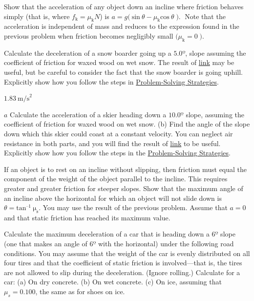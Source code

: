 \documentclass[
]{book}
\newenvironment{problems-exercises}{}{}
\begin{document}
\begin{problems-exercises}
\hypertarget{fs-id1395614}{}
\leavevmode\hypertarget{fs-id1395616}{}%
Show that the acceleration of any object down an incline where friction
behaves simply (that is, where \({{f_{\text{k}} = \mu_{\text{k}}}N}{}\))
is
\({{a = g}(\ \text{sin}\ {\theta - \mu_{\text{k}}}\text{cos}\ \theta\operatorname{).}}{}\)
Note that the acceleration is independent of mass and reduces to the
expression found in the previous problem when friction becomes
negligibly small \({({\mu_{\text{k}} = 0}\operatorname{).}}{}\)

\hypertarget{fs-id1555366}{}
\leavevmode\hypertarget{fs-id1555367}{}%
Calculate the deceleration of a snow boarder going up a \(5.0º{}\), slope
assuming the coefficient of friction for waxed wood on wet snow. The
result of \protect\hyperlink{fs-id1395614}{link} may be useful,
but be careful to consider the fact that the snow boarder is going
uphill. Explicitly show how you follow the steps in \href{/m54861}{Problem-Solving
Strategies}.

\leavevmode\hypertarget{fs-id1311021}{}%
\({1\text{.}\text{83}\ \text{m/s}^{2}}{}\)

\hypertarget{fs-id1453574}{}
\leavevmode\hypertarget{fs-id1329159}{}%
\(a\) Calculate the acceleration of a skier heading down a
\({\text{10}\text{.}0º}{}\) slope, assuming the coefficient of friction
for waxed wood on wet snow. (b) Find the angle of the slope down which
this skier could coast at a constant velocity. You can neglect air
resistance in both parts, and you will find the result of
\protect\hyperlink{fs-id1395614}{link} to be useful. Explicitly
show how you follow the steps in the \href{/m54861}{Problem-Solving
Strategies}.

\hypertarget{fs-id1736769}{}
\leavevmode\hypertarget{fs-id1300112}{}%
If an object is to rest on an incline without slipping, then friction
must equal the component of the weight of the object parallel to the
incline. This requires greater and greater friction for steeper slopes.
Show that the maximum angle of an incline above the horizontal for which
an object will not slide down is
\(\theta = \text{tan}^{\text{–1}}\ \text{μ}_{\text{s}}\). You may use the
result of the previous problem. Assume that \(a = \text{0}\) and that
static friction has reached its maximum value.

\hypertarget{fs-id855543}{}
\leavevmode\hypertarget{fs-id1244141}{}%
Calculate the maximum deceleration of a car that is heading down a
\(6º{}\) slope (one that makes an angle of \(6º{}\) with the horizontal)
under the following road conditions. You may assume that the weight of
the car is evenly distributed on all four tires and that the coefficient
of static friction is involved---that is, the tires are not allowed to
slip during the deceleration. (Ignore rolling.) Calculate for a car: (a)
On dry concrete. (b) On wet concrete. (c) On ice, assuming that
\({{\mu_{s} = 0}\text{.}\text{100}}{}\), the same as for shoes on ice.


\end{problems-exercises}
\end{document}
